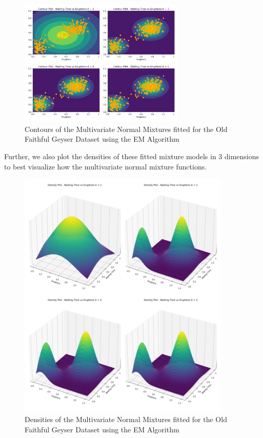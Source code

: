 \documentclass[11pt]{article}
\begin{document}
\begin{figure}[H]
  \centering
  \includegraphics[width = 0.7\textwidth]{Contour Plots.png}
  \caption{Contours of the Multivariate Normal Mixtures fitted for the Old Faithful Geyser Dataset using the EM Algorithm}
\end{figure}
\noindent Further, we also plot the densities of these fitted mixture models in 3 dimensions to best visualize how the multivariate normal mixture functions.
\begin{figure}[H]
  \centering
  \includegraphics[width = 0.9\textwidth]{Density Plots.png}
  \caption{Densities of the Multivariate Normal Mixtures fitted for the Old Faithful Geyser Dataset using the EM Algorithm}
\end{figure}
\end{document}
